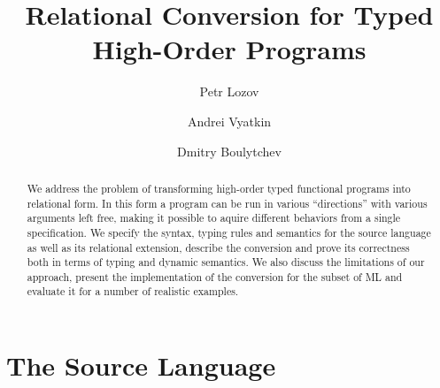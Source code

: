\documentclass{llncs}
\begin{document}
\mainmatter

\title{Relational Conversion for Typed High-Order Programs}

\author{
  Petr Lozov \and Andrei Vyatkin \and Dmitry Boulytchev
}


\maketitle

\begin{abstract}
We address the problem of transforming high-order typed functional programs into relational form. 
In this form a program can be run in various ``directions'' with various arguments left free, making it possible to
aquire different behaviors from a single specification. We specify the syntax, typing rules and semantics for the source language
as well as its relational extension, describe the conversion and prove its correctness both in terms of typing and dynamic
semantics. We also discuss the limitations of our approach, present the implementation of the conversion for the subset of ML and 
evaluate it for a number of realistic examples.
\end{abstract}




\section{The Source Language}
\end{document}
